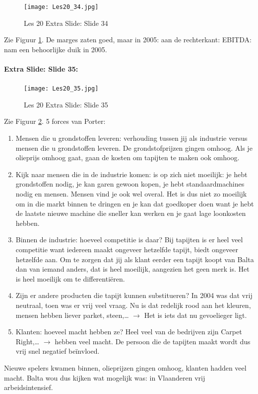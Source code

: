 \documentclass[10pt,a4paper]{report}
\begin{document}
\begin{figure}[h!]
\centering
\texttt{[image: Les20\_34.jpg]}
\caption{Les 20 Extra Slide: Slide 34} 
\label{les20_34}
\end{figure}


Zie Figuur \ref{les20_34}. De marges zaten goed, maar in 2005: aan de rechterkant: EBITDA: nam een behoorlijke duik in 2005.

\paragraph{Extra Slide: Slide 35:}

\begin{figure}[h!]
\centering
\texttt{[image: Les20\_35.jpg]}
\caption{Les 20 Extra Slide: Slide 35} 
\label{les20_35}
\end{figure}

Zie Figuur \ref{les20_35}. 5 forces van Porter: 
\begin{enumerate}
\item Mensen die u grondstoffen leveren: verhouding tussen jij als industrie versus mensen die u grondstoffen leveren. De grondstofprijzen gingen omhoog. Als je olieprijs omhoog gaat, gaan de kosten om tapijten te maken ook omhoog.
\item Kijk naar mensen die in de industrie komen: is op zich niet moeilijk: je hebt grondstoffen nodig, je kan garen gewoon kopen, je hebt standaardmachines nodig en mensen. Mensen vind je ook wel overal. Het is dus niet zo moeilijk om in die markt binnen te dringen en je kan dat goedkoper doen want je hebt de laatste nieuwe machine die sneller kan werken en je gaat lage loonkosten hebben.
\item Binnen de industrie: hoeveel competitie is daar? Bij tapijten is er heel veel competitie want iedereen maakt ongeveer hetzelfde tapijt, biedt ongeveer hetzelfde aan. Om te zorgen dat jij als klant eerder een tapijt koopt van Balta dan van iemand anders, dat is heel moeilijk, aangezien het geen merk is. Het is heel moeilijk om te differenti\"eren.
\item Zijn er andere producten die tapijt kunnen substitueren? In 2004 was dat vrij neutraal, toen was er vrij veel vraag. Nu is dat redelijk rood aan het kleuren, mensen hebben liever parket, steen,… $\rightarrow$ Het is iets dat nu gevoelieger ligt.
\item Klanten: hoeveel macht hebben ze? Heel veel van de bedrijven zijn Carpet Right,… $\rightarrow$ hebben veel macht. De persoon die de tapijten maakt wordt dus vrij snel negatief be\"invloed.
\end{enumerate}
Nieuwe spelers kwamen binnen, olieprijzen gingen omhoog, klanten hadden veel macht. Balta wou dus kijken wat mogelijk was: in Vlaanderen vrij arbeidsintensief.
\end{document}
